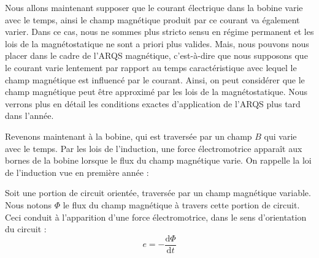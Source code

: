 \documentclass[11pt,fleqn]{book} %
\newcommand{\dd}{\mathrm{d}}
\begin{document}
%

Nous allons maintenant supposer que le courant électrique dans la bobine varie avec le temps, ainsi le champ magnétique produit par ce courant va également varier. Dans ce cas, nous ne sommes plus stricto sensu en régime permanent et les lois de la magnétostatique ne sont a priori plus valides. Mais, nous pouvons nous placer dans le cadre de l'ARQS magnétique, c'est-à-dire que nous supposons que le courant varie lentement par rapport au temps caractéristique avec lequel le champ magnétique est influencé par le courant. Ainsi, on peut considérer que le champ magnétique peut être approximé par les lois de la magnétostatique. Nous verrons plus en détail les conditions exactes d'application de l'ARQS plus tard dans l'année.

Revenons maintenant à la bobine, qui est traversée par un champ $B$ qui varie avec le temps. Par les lois de l'induction, une force électromotrice apparaît aux bornes de la bobine lorsque le flux du champ magnétique varie. On rappelle la loi de l'induction vue en première année :

\begin{theorem}
    Soit une portion de circuit orientée, traversée par un champ magnétique variable. Nous notons $\Phi$ le flux du champ magnétique à travers cette portion de circuit. Ceci conduit à l'apparition d'une force électromotrice, dans le sens d'orientation du circuit :
    \begin{equation}
        e = - \frac{\dd \Phi}{\dd t}
    \end{equation}
\end{theorem}
\end{document}

